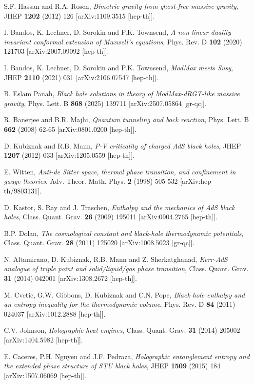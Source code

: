 \documentclass[12pt]{article}
\begin{document}
\begin{thebibliography}{99}
S.F. Hassan and R.A. Rosen, \emph{Bimetric gravity from ghost-free massive gravity}, JHEP \textbf{1202} (2012) 126 [arXiv:1109.3515 [hep-th]].

I. Bandos, K. Lechner, D. Sorokin and P.K. Townsend, \emph{A non-linear duality-invariant conformal extension of Maxwell's equations}, Phys. Rev. D \textbf{102} (2020) 121703 [arXiv:2007.09092 [hep-th]].

I. Bandos, K. Lechner, D. Sorokin and P.K. Townsend, \emph{ModMax meets Susy}, JHEP \textbf{2110} (2021) 031 [arXiv:2106.07547 [hep-th]].

B. Eslam Panah, \emph{Black hole solutions in theory of ModMax-dRGT-like massive gravity}, Phys. Lett. B \textbf{868} (2025) 139711 [arXiv:2507.05864 [gr-qc]].

R. Banerjee and B.R. Majhi, \emph{Quantum tunneling and back reaction}, Phys. Lett. B \textbf{662} (2008) 62-65 [arXiv:0801.0200 [hep-th]].

D. Kubiznak and R.B. Mann, \emph{P-V criticality of charged AdS black holes}, JHEP \textbf{1207} (2012) 033 [arXiv:1205.0559 [hep-th]].

E. Witten, \emph{Anti-de Sitter space, thermal phase transition, and confinement in gauge theories}, Adv. Theor. Math. Phys. \textbf{2} (1998) 505-532 [arXiv:hep-th/9803131].

D. Kastor, S. Ray and J. Traschen, \emph{Enthalpy and the mechanics of AdS black holes}, Class. Quant. Grav. \textbf{26} (2009) 195011 [arXiv:0904.2765 [hep-th]].

B.P. Dolan, \emph{The cosmological constant and black-hole thermodynamic potentials}, Class. Quant. Grav. \textbf{28} (2011) 125020 [arXiv:1008.5023 [gr-qc]].

N. Altamirano, D. Kubiznak, R.B. Mann and Z. Sherkatghanad, \emph{Kerr-AdS analogue of triple point and solid/liquid/gas phase transition}, Class. Quant. Grav. \textbf{31} (2014) 042001 [arXiv:1308.2672 [hep-th]].

M. Cvetic, G.W. Gibbons, D. Kubiznak and C.N. Pope, \emph{Black hole enthalpy and an entropy inequality for the thermodynamic volume}, Phys. Rev. D \textbf{84} (2011) 024037 [arXiv:1012.2888 [hep-th]].

C.V. Johnson, \emph{Holographic heat engines}, Class. Quant. Grav. \textbf{31} (2014) 205002 [arXiv:1404.5982 [hep-th]].

E. Caceres, P.H. Nguyen and J.F. Pedraza, \emph{Holographic entanglement entropy and the extended phase structure of STU black holes}, JHEP \textbf{1509} (2015) 184 [arXiv:1507.06069 [hep-th]].

\end{thebibliography}
\end{document}
